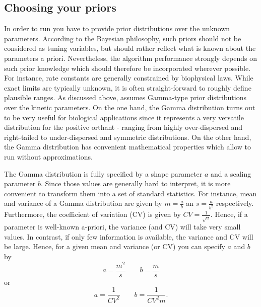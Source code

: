 \documentclass[a4paper, 9pt]{scrartcl}
\begin{document}
\subsection{Choosing your priors} \label{sec:Priors} In order to run \DPP you have to provide prior distributions over the unknown parameters. According to the Bayesian philosophy, such priors should not be considered as tuning variables, but should rather reflect what is known about the parameters a priori. Nevertheless, the algorithm performance strongly depends on such prior knowledge which should therefore be incorporated wherever possible. For instance, rate constants are generally constrained by biophysical laws. While exact limits are typically unknown, it is often straight-forward to roughly define plausible ranges. As discussed above, \DPP assumes Gamma-type prior distributions over the kinetic parameters. On the one hand, the Gamma distribution turns out to be very useful for biological applications since it represents a very versatile distribution for the positive orthant -  ranging from highly over-dispersed and right-tailed to under-dispersed and symmetric distributions. On the other hand, the Gamma distribution has convenient mathematical properties which allow to run \DPP without approximations.

The Gamma distribution is fully specified by a shape parameter $a$ and a scaling parameter $b$. Since those values are generally hard to interpret, it is more convenient to transform them into a set of standard statistics. For instance, mean and variance of a Gamma distribution are given by $m = \frac{a}{b}$ an $s = \frac{a}{b^{2}}$ respectively. Furthermore, the coefficient of variation (CV) is given by $CV=\frac{1}{\sqrt{a}}$. Hence, if a parameter is well-known a-priori, the variance (and CV) will take very small values. In contrast, if only few information is available, the variance and CV will be large. Hence, for a given mean and variance (or CV) you can specify $a$ and $b$ by 
\begin{equation}
	a = \frac{m^2}{s} \quad\quad b =\frac{m}{s}
\end{equation}
or 
\begin{equation}
	a = \frac{1}{CV^2} \quad \quad  b = \frac{1}{CV^2 m}.
\end{equation}


{\footnotesize
}
\end{document}
